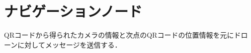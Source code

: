 \section{ナビゲーションノード}
\label{implement_navigation}

QRコードから得られたカメラの情報と次点のQRコードの位置情報を元にドローンに対してメッセージを送信する．

